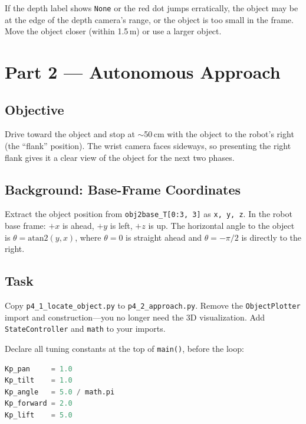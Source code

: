 \documentclass[11pt,a4paper]{article}
\begin{document}
\begin{warnbox}
If the depth label shows \texttt{None} or the red dot jumps erratically, the object may be at the edge of the depth camera's range, or the object is too small in the frame. Move the object closer (within 1.5\,m) or use a larger object.
\end{warnbox}

\newpage

\section*{Part 2 --- Autonomous Approach}

\subsection*{Objective}

Drive toward the object and stop at $\sim$50\,cm with the object to the robot's right (the ``flank'' position). The wrist camera faces sideways, so presenting the right flank gives it a clear view of the object for the next two phases.

\subsection*{Background: Base-Frame Coordinates}

Extract the object position from \texttt{obj2base\_T[0:3, 3]} as \texttt{x, y, z}. In the robot base frame: $+x$ is ahead, $+y$ is left, $+z$ is up. The horizontal angle to the object is $\theta = \text{atan2}(y, x)$, where $\theta = 0$ is straight ahead and $\theta = -\pi/2$ is directly to the right.

\subsection*{Task}

Copy \texttt{p4\_1\_locate\_object.py} to \texttt{p4\_2\_approach.py}. Remove the \texttt{ObjectPlotter} import and construction---you no longer need the 3D visualization. Add \texttt{StateController} and \texttt{math} to your imports.

Declare all tuning constants at the top of \texttt{main()}, before the loop:

\begin{lstlisting}[language=Python]
Kp_pan     = 1.0
Kp_tilt    = 1.0
Kp_angle   = 5.0 / math.pi
Kp_forward = 2.0
Kp_lift    = 5.0
\end{lstlisting}
\end{document}
